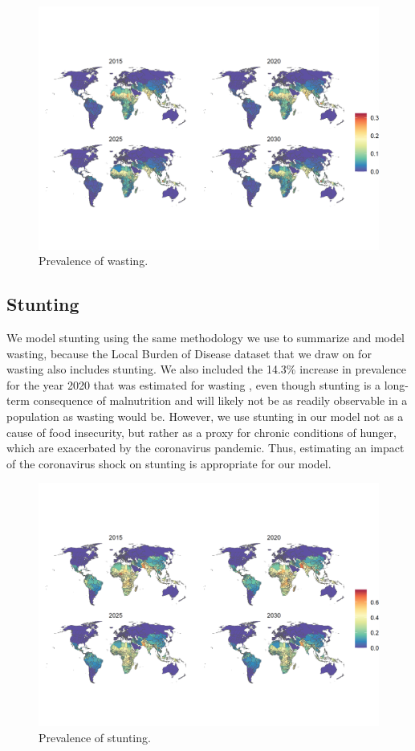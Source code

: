 \documentclass{article}
\begin{document}
\begin{figure}[H]
  \centering
  \includegraphics[width=\linewidth]{img/covars/wasting.png}
  \caption{Prevalence of wasting.}
\end{figure}

\subsection{Stunting}

We model stunting using the same methodology we use to summarize and model wasting, because the Local Burden of Disease dataset that we draw on for wasting also includes stunting.  We also included the 14.3\% increase in prevalence for the year 2020 that was estimated for wasting \citep{headey2020impacts}, even though stunting is a long-term consequence of malnutrition and will likely not be as readily observable in a population as wasting would be.  However, we use stunting in our model not as a cause of food insecurity, but rather as a proxy for chronic conditions of hunger, which are exacerbated by the coronavirus pandemic.  Thus, estimating an impact of the coronavirus shock on stunting is appropriate for our model.

\begin{figure}[H]
  \centering
  \includegraphics[width=\linewidth]{img/covars/stunting.png}
  \caption{Prevalence of stunting.}
\end{figure}
\end{document}
